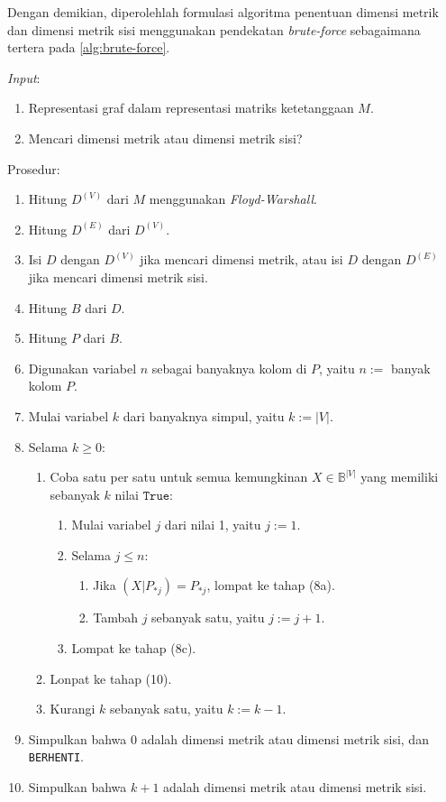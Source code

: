 \documentclass[10pt,twocolumn]{article}
\newcommand{\foreign}[1]{\foreignlanguage{english}{\textit{#1}}}
\def\True{\mathtt{True}}
\def\Bbb{\mathbb{B}}
\begin{document}
Dengan demikian, diperolehlah formulasi algoritma penentuan dimensi metrik dan dimensi metrik sisi menggunakan pendekatan \foreign{brute-force} sebagaimana tertera pada \autoref{alg:brute-force}.

\begin{algorithm}[H]
	\foreign{Input}:
	\begin{enumerate}
		\item Representasi graf dalam representasi matriks ketetanggaan \(M\).
		\item Mencari dimensi metrik atau dimensi metrik sisi?
	\end{enumerate}
	Prosedur:
	\begin{enumerate}
		\item Hitung \(D^{(V)}\) dari \(M\) menggunakan \foreign{Floyd-Warshall}.
		\item Hitung \(D^{(E)}\) dari \(D^{(V)}\).
		\item Isi \(D\) dengan \(D^{(V)}\) jika mencari dimensi metrik, atau isi \(D\) dengan \(D^{(E)}\) jika mencari dimensi metrik sisi.
		\item Hitung \(B\) dari \(D\).
		\item Hitung \(P\) dari \(B\).
		\item Digunakan variabel \(n\) sebagai banyaknya kolom di \(P\), yaitu \(n :=\) banyak kolom \(P\).
		\item Mulai variabel \(k\) dari banyaknya simpul, yaitu \(k := |V|\).
		\item Selama \(k \geq 0\):
			\begin{enumerate}
				\item Coba satu per satu untuk semua kemungkinan \(X \in \Bbb^{|V|}\) yang memiliki sebanyak \(k\) nilai \(\True\):
					\begin{enumerate}
						\item Mulai variabel \(j\) dari nilai 1, yaitu \(j := 1\).
						\item Selama \(j \leq n\):
							\begin{enumerate}
								\item Jika \((X|P_{*j}) = P_{*j}\), lompat ke tahap (8a).
								\item Tambah \(j\) sebanyak satu, yaitu \(j := j + 1\).
							\end{enumerate}
						\item Lompat ke tahap (8c).
					\end{enumerate}
				\item Lonpat ke tahap (10).
				\item Kurangi \(k\) sebanyak satu, yaitu \(k := k - 1\).
			\end{enumerate}
		\item Simpulkan bahwa 0 adalah dimensi metrik atau dimensi metrik sisi, dan \texttt{BERHENTI}.
		\item Simpulkan bahwa \(k + 1\) adalah dimensi metrik atau dimensi metrik sisi.
	\end{enumerate}
	\caption{\foreign{Brute-force}}
	\label{alg:brute-force}
\end{algorithm}
\end{document}
